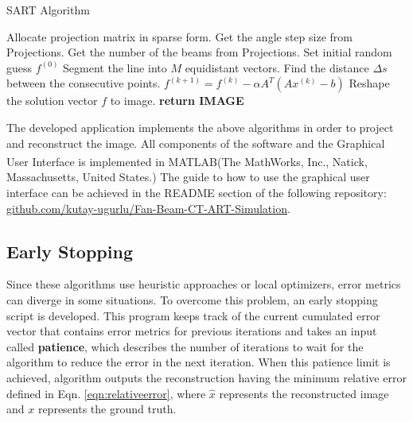 \documentclass[journal]{IEEEtran}
\begin{document}
\begin{algorithm}[h]
	\caption{SART Algorithm}
	\begin{algorithmic}
		\State Allocate projection matrix in sparse form.
		\State Get the angle step size from Projections. 
		\State Get the number of the beams from Projections. 
		\State Set initial random guess $f^{(0)}$
				\State Segment the line into $M$ equidistant vectors. 
				\State Find the distance $\Delta s$ between the consecutive points.
				\EndFor 
			  \EndFor
		   \EndFor
				\State $f^{(k+1)} = f^{(k)} - \alpha A^T(Ax^{(k)}-b)$
		   \EndFor
		   \State Reshape the solution vector $f$ to image. 
		   \State \textbf{return IMAGE}
		\EndProcedure
	\label{alg:SART}
	\end{algorithmic}
\end{algorithm}

\newpage

The developed application implements the above algorithms in order to project and reconstruct the image. All components of the software and the Graphical User Interface is implemented in MATLAB(The MathWorks\textsuperscript{\textregistered}, Inc., Natick, Massachusetts, United States.) The guide to how to use the graphical user interface can be achieved in the README section of the following repository: \href{https://github.com/kutay-ugurlu/Fan-Beam-CT-ART-Simulation}{github.com/kutay-ugurlu/Fan-Beam-CT-ART-Simulation}.

\subsection{Early Stopping}
Since these algorithms use heuristic approaches or local optimizers, error metrics can diverge in some situations. To overcome this problem, an early stopping script is developed. This program keeps track of the current cumulated error vector that contains error metrics for previous iterations and takes an input called \textbf{patience}, which describes the number of iterations to wait for the algorithm to reduce the error in the next iteration. When this patience limit is achieved, algorithm outputs the reconstruction having the minimum relative error defined in Eqn. \ref{eqn:relativeerror}, where $\hat{x}$ represents the reconstructed image and $x$ represents the ground truth.  
\end{document}
